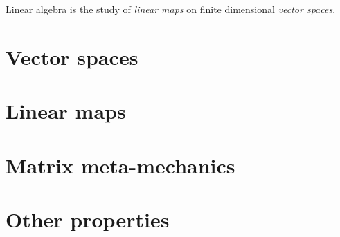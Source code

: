 
Linear algebra is the study of \emph{linear maps} on finite dimensional \emph{vector spaces}.

\section{Vector spaces} 


\section{Linear maps} 


\section{Matrix meta-mechanics} 


\section{Other properties} 

